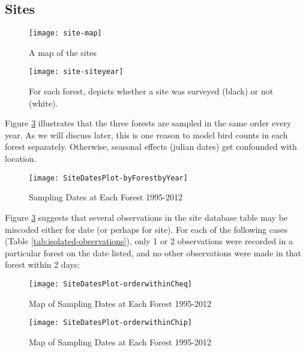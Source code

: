 \subsection{Sites}






\begin{figure}
\texttt{[image: site-map]}
\caption{A map of the sites}
\label{fig:site-map}
\end{figure}


\begin{figure}
\texttt{[image: site-siteyear]}
\caption{For each forest, depicts whether a site was surveyed (black) or not (white).}
\label{fig:site-siteyear}
\end{figure}

Figure \ref{fig:SiteDatesPlot-byForestbyYear} illustrates that the three forests are sampled in the same order every year.  As we will discuss later, this is one reason to model bird counts in each forest separately.  Otherwise, seasonal effects (julian dates) get confounded with location.

\begin{figure}
\texttt{[image: SiteDatesPlot-byForestbyYear]}
\caption{Sampling Dates at Each Forest 1995-2012}
\label{fig:SiteDatesPlot-byForestbyYear}
\end{figure}

Figure \ref{fig:SiteDatesPlot-byForestbyYear} suggests that several observations in the site database table may be miscoded either for date (or perhaps for site).  For each of the following cases (Table \ref{tab:isolated-observations}), only 1 or 2 observations were recorded in a particular forest on the date listed, and no other observations were made in that forest within 2 days:



\begin{figure}
\texttt{[image: SiteDatesPlot-orderwithinCheq]}
\caption{Map of Sampling Dates at Each Forest 1995-2012}
\label{fig:SiteDatesPlot-orderwithinCheq}
\end{figure}

\begin{figure}
\texttt{[image: SiteDatesPlot-orderwithinChip]}
\caption{Map of Sampling Dates at Each Forest 1995-2012}
\label{fig:SiteDatesPlot-orderwithinChip}
\end{figure}

